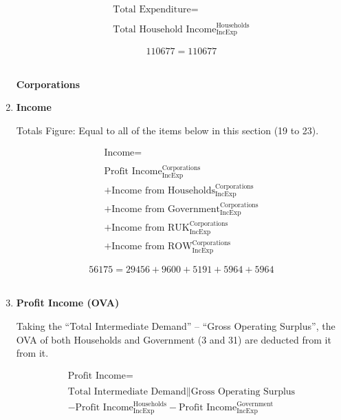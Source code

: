 \begin{enumerate}
\begin{equation}
\begin{split}
\text{Total Expenditure} =  \\ \\
\text{Total Household Income}^\text{Households}_\text{IncExp}
\end{split} \label{eq:2.5.21}
\end{equation}

\begin{equation} \nonumber
110677 = 110677
\end{equation}\\



\pagebreak

\begin{center}
\textbf{\LARGE Corporations}
\end{center}

\item \textbf {Income}

Totals Figure: Equal to all of the items below in this section (19 to 23).

\begin{equation}
\begin{split}
\text{Income} =  \\ \\
\text{Profit Income}^\text{Corporations}_\text{IncExp}\\
+\text{Income from Households}^\text{Corporations}_\text{IncExp}\\
+\text{Income from Government}^\text{Corporations}_\text{IncExp}\\
+\text{Income from RUK}^\text{Corporations}_\text{IncExp}\\
+\text{Income from ROW}^\text{Corporations}_\text{IncExp}
\end{split} \label{eq:2.5.22}
\end{equation}

\begin{equation} \nonumber
56175 = 29456+9600+5191+5964+5964
\end{equation}\\

\item \textbf {Profit Income (OVA)}

Taking the “Total Intermediate Demand” – “Gross Operating Surplus”, the OVA of both Households and Government (3 and 31) are deducted from it from it.  \cite{ScotGov2013a,ONS2011b}

\begin{equation}
\begin{split}
\text{Profit Income} =  \\ \\
\text{Total Intermediate Demand}\|\text{Gross Operating Surplus}\\
-\text{Profit Income}^\text{Households}_\text{IncExp}-\text{Profit Income}^\text{Government}_\text{IncExp}
\end{split} \label{eq:2.5.23}
\end{equation}


\end{enumerate}
